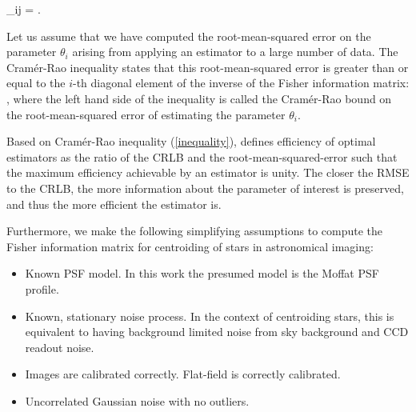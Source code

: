 \beq 
{}_{ij} = .
\label{fisher1}
\eeq

Let us assume that we have computed the root-mean-squared error on the parameter $\theta_{i}$ arising from applying an estimator to a large number of data. The Cram\'{e}r-Rao inequality states that this root-mean-squared error is greater than or equal to the $i$-th diagonal element of the inverse of the Fisher information matrix:
\beq
 \geq {},
\label{inequality}
\eeq
where the left hand side of the inequality is called the Cram\'{e}r-Rao bound on 
the root-mean-squared error of estimating the parameter $\theta_{i}$.

Based on Cram\'{e}r-Rao inequality (\ref{inequality}), \citet{crlb} defines efficiency of optimal estimators as the ratio of the CRLB and the root-mean-squared-error such that the maximum efficiency achievable by an estimator is unity. The closer the RMSE to the CRLB, 
the more information about the parameter of interest is preserved, and thus the more efficient the estimator is. 

Furthermore, we make the following simplifying assumptions to compute the Fisher information matrix for centroiding of stars in astronomical imaging:

\begin{itemize}
  \item Known PSF model. In this work the presumed model is the Moffat PSF profile.
  \item Known, stationary noise process. In the context of centroiding stars, this is equivalent to 
        having background limited noise from sky background and CCD readout noise.
  \item Images are calibrated correctly. Flat-field is correctly calibrated.       
  \item Uncorrelated Gaussian noise with no outliers. 
\end{itemize}



